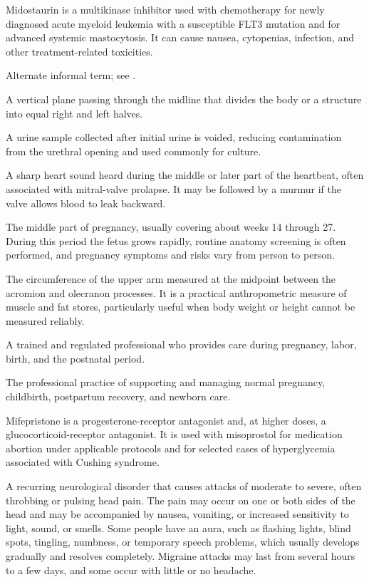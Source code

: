  Midostaurin is a multikinase inhibitor used with chemotherapy for newly diagnosed acute myeloid leukemia with a susceptible FLT3 mutation and for advanced systemic mastocytosis. It can cause nausea, cytopenias, infection, and other treatment-related toxicities.

 Alternate informal term; see .

 A vertical plane passing through the midline that divides the body or a structure into equal right and left halves.

 A urine sample collected after initial urine is voided, reducing contamination from the urethral opening and used commonly for culture.

 A sharp heart sound heard during the middle or later part of the heartbeat, often associated with mitral-valve prolapse. It may be followed by a murmur if the valve allows blood to leak backward.

 The middle part of pregnancy, usually covering about weeks 14 through 27. During this period the fetus grows rapidly, routine anatomy screening is often performed, and pregnancy symptoms and risks vary from person to person.

 The circumference of the upper arm measured at the midpoint between the acromion and
olecranon processes. It is a practical anthropometric measure of muscle and fat stores,
particularly useful when body weight or height cannot be measured reliably.

 A trained and regulated professional who provides care during pregnancy, labor, birth, and the postnatal period.

 The professional practice of supporting and managing normal pregnancy, childbirth, postpartum recovery, and newborn care.

 Mifepristone is a progesterone-receptor antagonist and, at higher doses, a glucocorticoid-receptor antagonist. It is used with misoprostol for medication abortion under applicable protocols and for selected cases of hyperglycemia associated with Cushing syndrome.

 A recurring neurological disorder that causes attacks of moderate to severe, often throbbing or pulsing head pain. The pain may occur on one or both sides of the head and may be accompanied by nausea, vomiting, or increased sensitivity to light, sound, or smells. Some people have an aura, such as flashing lights, blind spots, tingling, numbness, or temporary speech problems, which usually develops gradually and resolves completely. Migraine attacks may last from several hours to a few days, and some occur with little or no headache.


